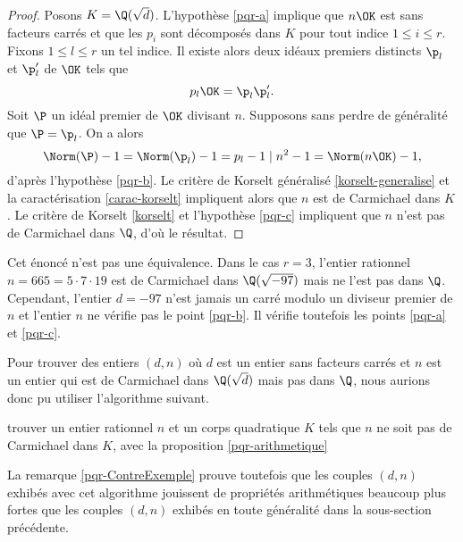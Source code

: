 \begin{proof}
	Posons $K=\Q(\sqrt{d})$. L'hypothèse \ref{pqr-a} implique que $n\OK$ est sans facteurs carrés et que les $p_i$ sont décomposés dans $K$ pour tout indice $1\leq i \leq r$. Fixons $1\leq l \leq r$ un tel indice. Il existe alors deux idéaux premiers distincts $\p_l$ et $\p_l'$ de $\OK$ tels que \[p_l\OK = \p_l\p_l'.\] Soit $\P$ un idéal premier de $\OK$ divisant $n$. Supposons sans perdre de généralité que $\P = \p_l$. On a alors \[\Norm(\P) - 1 = \Norm(\p_l) - 1 = p_l - 1\mid n^2 - 1 = \Norm(n\OK) - 1,\] d'après l'hypothèse \ref{pqr-b}. Le critère de Korselt généralisé \ref{korselt-generalise} et la caractérisation \ref{carac-korselt} impliquent alors que $n$ est de Carmichael dans $K$. Le critère de Korselt \ref{korselt} et l'hypothèse \ref{pqr-c} impliquent que $n$ n'est pas de Carmichael dans $\Q$, d'où le résultat.
\end{proof}

\begin{remarque}\label{pqr-ContreExemple}
	Cet énoncé n'est pas une équivalence. Dans le cas $r=3$, l'entier rationnel $n=665 = 5\cdot 7 \cdot 19$ est de Carmichael dans $\Q(\sqrt{-97})$ mais ne l'est pas dans $\Q$. Cependant, l'entier $d = -97$ n'est jamais un carré modulo un diviseur premier de $n$ et l'entier $n$ ne vérifie pas le point \ref{pqr-b}. Il vérifie toutefois les points \ref{pqr-a} et \ref{pqr-c}.
\end{remarque}

Pour trouver des entiers $(d, n)$ où $d$ est un entier sans facteurs carrés et $n$ est un entier qui est de Carmichael dans $\Q(\sqrt{d})$ mais pas dans $\Q$, nous aurions donc pu utiliser l'algorithme suivant.

\vspace{1em}
\begin{algorithm}[H]
\caption{trouver un entier rationnel $n$ et un corps quadratique $K$ tels que $n$ ne soit pas de Carmichael dans $K$, avec la proposition \ref{pqr-arithmetique}}
\end{algorithm}
\vspace{1em}

La remarque \ref{pqr-ContreExemple} prouve toutefois que les couples $(d, n)$ exhibés avec cet algorithme jouissent de propriétés arithmétiques beaucoup plus fortes que les couples $(d, n)$ exhibés en toute généralité dans la sous-section précédente.
